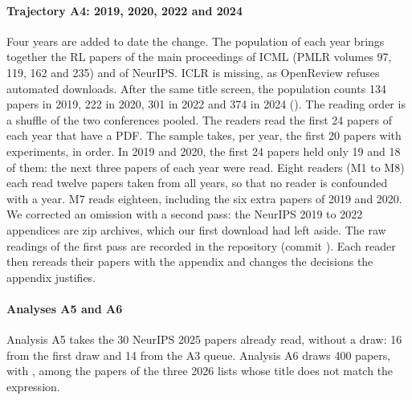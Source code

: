 \paragraph{Trajectory A4: 2019, 2020, 2022 and 2024}
Four years are added to date the change. The
population of each year brings together the RL papers of the main proceedings of ICML (PMLR volumes 97,
119, 162 and 235) and of NeurIPS. ICLR is missing, as OpenReview refuses automated downloads. After the
same title screen, the population counts 134 papers in 2019, 222 in 2020, 301 in 2022 and
374 in 2024 (). The reading order is a
 shuffle of the two conferences pooled. The readers read the first 24 papers
of each year that have a PDF. The sample takes, per year, the first 20  papers with
experiments, in order. In 2019 and 2020, the first 24 papers held only 19 and 18 of them: the next
three papers of each year were read. Eight readers (M1 to M8) each read twelve papers taken
from all years, so that no reader is confounded with a year. M7 reads eighteen, including the six extra
papers of 2019 and 2020. We corrected an omission with a second pass: the NeurIPS 2019 to 2022
appendices are zip archives, which our first download had left aside. The raw readings of the first pass are recorded
in the repository (commit ). Each reader then rereads their papers with the appendix and
changes the decisions the appendix justifies.

\paragraph{Analyses A5 and A6}
Analysis A5 takes the 30 NeurIPS 2025 papers already read, without a draw: 16 from the
first draw and 14 from the A3 queue. Analysis A6 draws 400 papers, with
, among the papers of the three 2026 lists whose title does not match the
expression.

